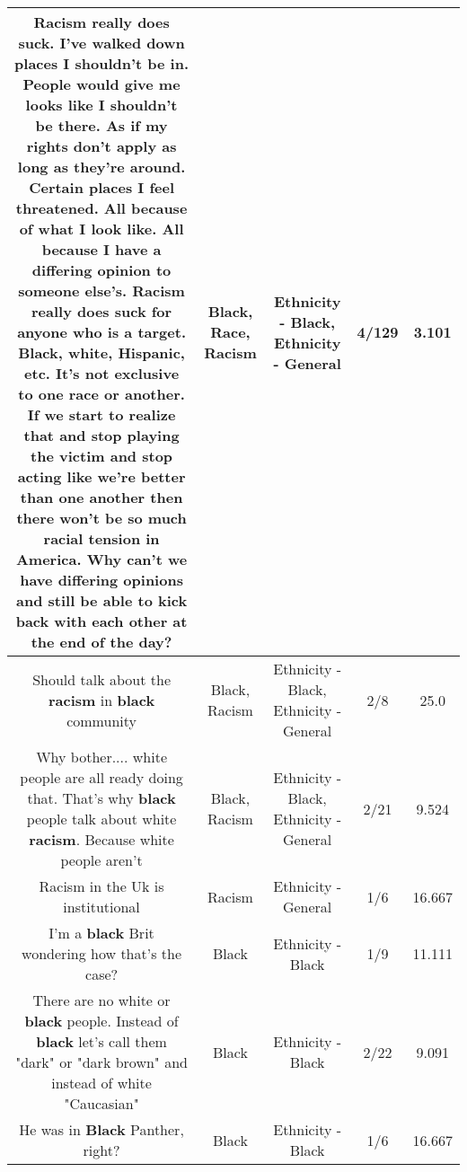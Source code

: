 \documentclass[11pt]{article}
\newlength\mylength
\begin{document}
\begin{center}
\begin{longtable}{|C{.65\mylength}|C{.30\mylength}|C{.12\mylength}|C{.12\mylength}|C{.12\mylength}|}
  \small Racism really does suck. I've walked down places I shouldn't be in. People would give me looks like I shouldn't be there. As if my rights don't apply as long as they're around. Certain places I feel threatened. All because of what I look like. All because I have a differing opinion to someone else's. \textbf{Racism} really does suck for anyone who is a target. \textbf{Black}, white, Hispanic, etc. It's not exclusive to one \textbf{race} or another. If we start to realize that and stop playing the victim and stop acting like we're better than one another then there won't be so much racial tension in America. Why can't we have differing opinions and still be able to kick back with each other at the end of the day?\normalsize   & Black, Race, Racism & Ethnicity - Black, Ethnicity - General & 4/129 & 3.101 \\  \hline
  \small Should talk about the \textbf{racism} in \textbf{black} community\normalsize   & Black, Racism & Ethnicity - Black, Ethnicity - General & 2/8 & 25.0 \\  \hline
  \small Why bother.... white people are all ready doing that. That's why \textbf{black} people talk about white \textbf{racism}. Because white people aren't\normalsize   & Black, Racism & Ethnicity - Black, Ethnicity - General & 2/21 & 9.524 \\  \hline
  \small Racism in the Uk is institutional\normalsize   & Racism & Ethnicity - General & 1/6 & 16.667 \\  \hline
  \small I'm a \textbf{black} Brit wondering how that's the case?\normalsize   & Black & Ethnicity - Black & 1/9 & 11.111 \\  \hline
  \small There are no white or \textbf{black} people. Instead of \textbf{black} let's call them "dark" or "dark brown" and instead of white "Caucasian"\normalsize   & Black & Ethnicity - Black & 2/22 & 9.091 \\  \hline
  \small He was in \textbf{Black} Panther, right?\normalsize   & Black & Ethnicity - Black & 1/6 & 16.667 \\  \hline

\end{longtable}
\end{center}
\end{document}
